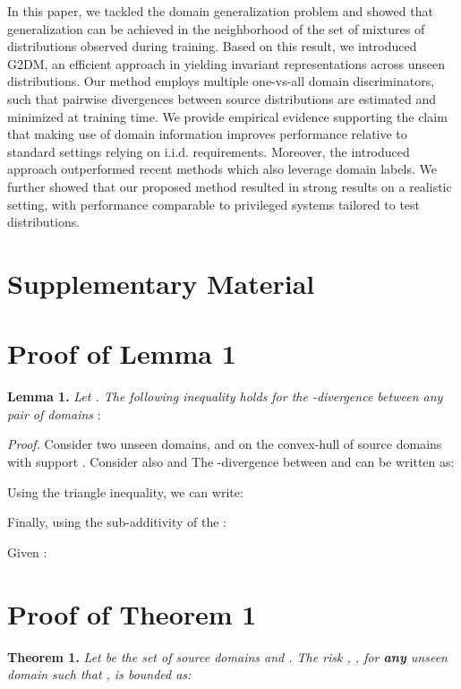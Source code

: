 \documentclass{article}
\begin{document}
In this paper, we tackled the domain generalization problem and showed that generalization can be achieved in the neighborhood of the set of mixtures of distributions observed during training. Based on this result, we introduced G2DM, an efficient approach in yielding invariant representations across unseen distributions. Our method employs multiple one-vs-all domain discriminators, such that pairwise divergences between source distributions are estimated and minimized at training time. We provide empirical evidence supporting the claim that making use of domain information improves performance relative to standard settings relying on i.i.d. requirements. Moreover, the introduced approach outperformed recent methods which also leverage domain labels. We further showed that our proposed method resulted in strong results on a realistic setting, with performance comparable to privileged systems tailored to test distributions. 




















\clearpage
\appendix
\section*{Supplementary Material}

\section{Proof of Lemma 1}
\textbf{Lemma 1.} \textit{Let . The following inequality holds for the -divergence between any pair of domains }:



\textit{Proof.} Consider two unseen domains,  and  on the convex-hull  of  source domains with support . Consider also  and 
The -divergence between  and  can be written as:



Using the triangle inequality, we can write:


Finally, using the sub-additivity of the :


Given  :


\section{Proof of Theorem 1}
\textbf{Theorem 1.} \textit{Let  be the set of source domains and  . The risk , , for \textbf{any} unseen domain  such that , is bounded as:}
\end{document}

